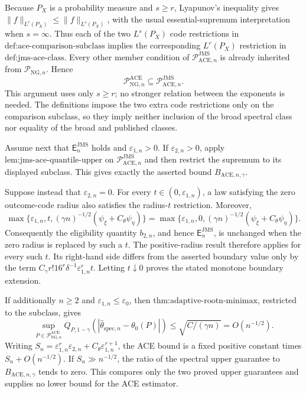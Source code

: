 Because \(P_X\) is a probability measure and \(s\ge r\), Lyapunov's inequality gives \(\|f\|_{L^r(P_X)}\le\|f\|_{L^s(P_X)}\), with the usual essential-supremum interpretation when \(s=\infty\). Thus each of the two \(L^s(P_X)\) code restrictions in \(\text{def:ace-comparison-subclass}\) implies the corresponding \(L^r(P_X)\) restriction in \(\text{def:jms-ace-class}\). Every other member condition of \(\mathcal P_{\mathrm{ACE},n}^{\mathrm{JMS}}\) is already inherited from \(\mathcal P_{\mathrm{NG},n}\). Hence
\[
 \mathcal P_{\mathrm{NG},n}^{\mathrm{ACE}}
 \subseteq\mathcal P_{\mathrm{ACE},n}^{\mathrm{JMS}}.
\]
This argument uses only \(s\ge r\); no stronger relation between the exponents is needed. The definitions impose the two extra code restrictions only on the comparison subclass, so they imply neither inclusion of the broad spectral class nor equality of the broad and published classes.

Assume next that \(\mathsf E_n^{\mathrm{JMS}}\) holds and \(\varepsilon_{1,n}>0\). If \(\varepsilon_{2,n}>0\), apply \(\text{lem:jms-ace-quantile-upper}\) on \(\mathcal P_{\mathrm{ACE},n}^{\mathrm{JMS}}\) and then restrict the supremum to its displayed subclass. This gives exactly the asserted bound \(B_{\mathrm{ACE},n,\gamma}\).

Suppose instead that \(\varepsilon_{2,n}=0\). For every \(t\in(0,\varepsilon_{1,n})\), a law satisfying the zero outcome-code radius also satisfies the radius-\(t\) restriction. Moreover,
\[
 \max\{\varepsilon_{1,n},t,
 (\gamma n)^{-1/2}(\psi_{\xi}+C_{\theta}\psi_{\eta})\}
 =
 \max\{\varepsilon_{1,n},0,
 (\gamma n)^{-1/2}(\psi_{\xi}+C_{\theta}\psi_{\eta})\}.
\]
Consequently the eligibility quantity \(b_{2,n}\), and hence \(\mathsf E_n^{\mathrm{JMS}}\), is unchanged when the zero radius is replaced by such a \(t\). The positive-radius result therefore applies for every such \(t\). Its right-hand side differs from the asserted boundary value only by the term \(C_{\gamma}r!16^r\delta^{-1}\varepsilon_{1,n}^rt\). Letting \(t\downarrow0\) proves the stated monotone boundary extension.

If additionally \(n\ge2\) and \(\varepsilon_{1,n}\le\varepsilon_0\), then \(\text{thm:adaptive-rootn-minimax}\), restricted to the subclass, gives
\[
 \sup_{P\in\mathcal P_{\mathrm{NG},n}^{\mathrm{ACE}}}
 Q_{P,1-\gamma}(|\widehat\theta_{\mathrm{spec},n}-\theta_0(P)|)
 \le \sqrt{C/(\gamma n)}=O(n^{-1/2}).
\]
Writing \(S_n=\varepsilon_{1,n}^r\varepsilon_{2,n}+C_{\theta}\varepsilon_{1,n}^{r+1}\), the ACE bound is a fixed positive constant times \(S_n+O(n^{-1/2})\). If \(S_n\gg n^{-1/2}\), the ratio of the spectral upper guarantee to \(B_{\mathrm{ACE},n,\gamma}\) tends to zero. This compares only the two proved upper guarantees and supplies no lower bound for the ACE estimator.